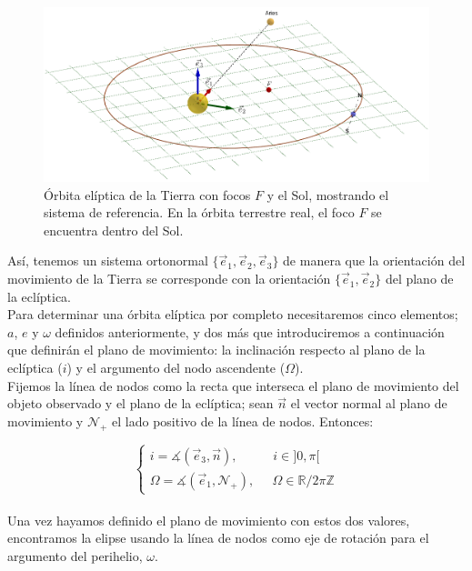\documentclass[11pt]{article}
\begin{document}
\begin{figure}[H]
\centering
\includegraphics[scale=0.35]{images/sistema_referencia_1.png}
\caption{Órbita elíptica de la Tierra con focos $F$ y el Sol, mostrando el sistema de referencia. En la órbita terrestre real, el foco $F$ se encuentra dentro del Sol.}
\label{fig:sistema_referencia}
\end{figure}

Así, tenemos un sistema ortonormal $\{\vec{e}_1,\vec{e}_2,\vec{e}_3\}$ de manera que la orientación del movimiento de la Tierra se corresponde con la orientación $\{\vec{e}_1,\vec{e}_2\}$ del plano de la eclíptica.\\

Para determinar una órbita elíptica por completo necesitaremos cinco elementos; $a$, $e$ y $\omega$ definidos anteriormente, y dos más que introduciremos a continuación que definirán el plano de movimiento: la inclinación respecto al plano de la eclíptica ($i$) y el argumento del nodo ascendente ($\Omega$).\\

Fijemos la línea de nodos como la recta que interseca el plano de movimiento del objeto observado y el plano de la eclíptica; sean $\vec{n}$ el vector normal al plano de movimiento y $\mathcal{N}_+$ el lado positivo de la línea de nodos. Entonces:

\[
\left\{
\begin{array}{l}
	i=\measuredangle(\vec{e}_3,\vec{n}), \; \; \; \; \; \; \; \; \; \; i\in]0,\pi[\\
	\Omega=\measuredangle(\vec{e}_1, \mathcal{N}_+), \; \; \; \; \; \Omega\in\mathbb{R}/2\pi\mathbb{Z}
\end{array}
\right.
\]\\

Una vez hayamos definido el plano de movimiento con estos dos valores, encontramos la elipse usando la línea de nodos como eje de rotación para el argumento del perihelio, $\omega$.
\end{document}
